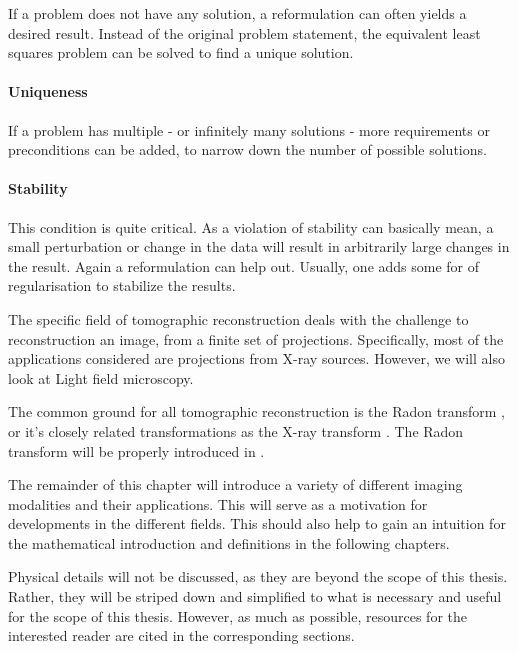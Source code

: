 If a problem does not have any solution, a reformulation can often yields a desired result. Instead
of the original problem statement, the equivalent least squares problem can be solved to find a
unique solution. 

\paragraph{Uniqueness}

If a problem has multiple - or infinitely many solutions - more requirements or preconditions can be
added, to narrow down the number of possible solutions. 

\paragraph{Stability}

This condition is quite critical. As a violation of stability can basically mean, a small
perturbation or change in the data will result in arbitrarily large changes in the result. Again a
reformulation can help out. Usually, one adds some for of regularisation to stabilize the results.

The specific field of tomographic reconstruction deals with the challenge to reconstruction an
image, from a finite set of projections. Specifically, most of the applications considered are
projections from X-ray sources. However, we will also look at Light field microscopy.

The common ground for all tomographic reconstruction is the Radon transform , or it's closely related transformations as the X-ray transform . The Radon transform will be properly introduced in .

The remainder of this chapter will introduce a variety of different imaging modalities and their
applications. This will serve as a motivation for developments in the different fields. This should
also help to gain an intuition for the mathematical introduction and definitions in the following
chapters.

Physical details will not be discussed, as they are beyond the scope of this thesis. Rather, they
will be striped down and simplified to what is necessary and useful for the scope of this thesis.
However, as much as possible, resources for the interested reader are cited in the corresponding
sections.

